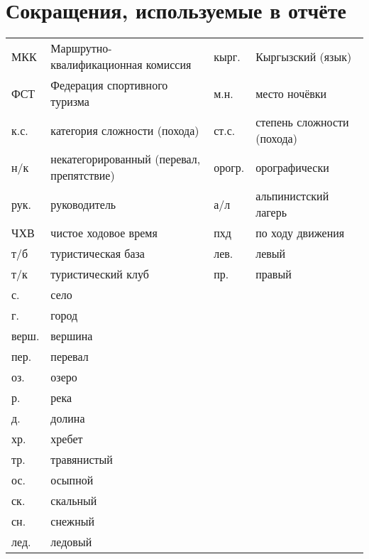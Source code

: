 \section*{Сокращения, используемые в отчёте}
\begin{table}[h!]
\centering
\begin{tabular}{p{} p{} | p{} p{}}
	МКК                                  &   Маршрутно-квалификационная комиссия  &	кырг.	&	Кыргызский (язык)	\\
	ФСТ                                &   Федерация спортивного туризма  & м.н. & место ночёвки \\
	к.с.                               &   категория сложности (похода) & 
	ст.с.							& степень сложности (похода) \\
	н/к                            &   некатегорированный (перевал, препятствие) &	орогр.                &   орографически \\
	рук. &   руководитель &а/л                  &   альпинистский лагерь  \\
	ЧХВ                          &   чистое ходовое время  &пхд	&	по ходу движения \\
	т/б                         &   туристическая база & лев. &   левый \\
	т/к                         &   туристический клуб & пр. &   правый \\
		с. & село & & \\
	г. & город & & \\
	верш.               &   вершина & & \\
	пер.               &   перевал & & \\
	оз.             &   озеро & & \\
	р.             &   река & & \\
	д.	&	долина & &\\
	хр. &   хребет& & \\
	тр. &   травянистый & &\\
	ос. &   осыпной& & \\
	ск. &   скальный & &\\
	сн. &   снежный & &\\
	лед. &   ледовый & &\\	
\end{tabular}
\end{table}
\clearpage